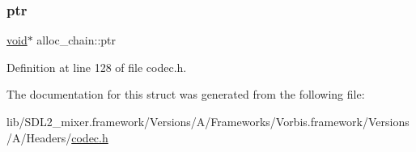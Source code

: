 \subsubsection{\texorpdfstring{ptr}{ptr}}
{\footnotesize\ttfamily \mbox{\hyperlink{_s_d_l__opengles2__gl2ext_8h_ae5d8fa23ad07c48bb609509eae494c95}{void}}$\ast$ alloc\+\_\+chain\+::ptr}



Definition at line 128 of file codec.\+h.



The documentation for this struct was generated from the following file\+:\begin{DoxyCompactItemize}
\item 
lib/\+S\+D\+L2\+\_\+mixer.\+framework/\+Versions/\+A/\+Frameworks/\+Vorbis.\+framework/\+Versions/\+A/\+Headers/\mbox{\hyperlink{codec_8h}{codec.\+h}}\end{DoxyCompactItemize}
